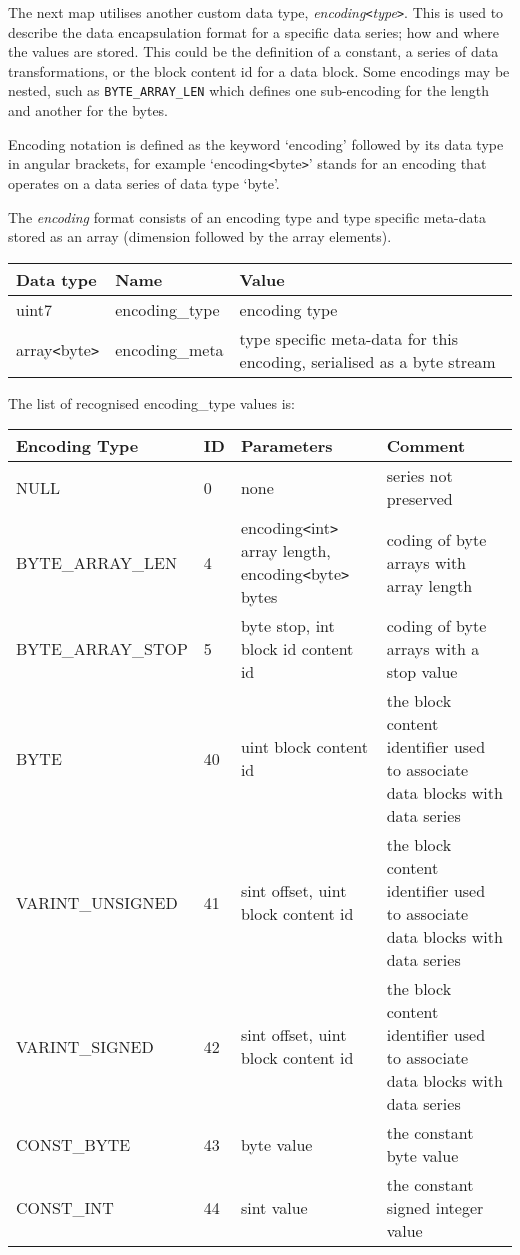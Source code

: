 \documentclass[a4paper]{article}
\begin{document}
The next map utilises another custom data type, \textit{encoding\texttt{<}type\texttt{>}}.
This is used to describe the data encapsulation format for a specific data series; how and where the values are stored.  This could be
the definition of a constant, a series of data transformations, or the
block content id for a data block.  Some encodings may be nested,
such as \texttt{BYTE\_ARRAY\_LEN} which defines one sub-encoding for the
length and another for the bytes.

Encoding notation is defined as the keyword `encoding' followed by its data type 
in angular brackets, for example `encoding\texttt{<}byte\texttt{>}' stands for 
an encoding that operates on a data series of data type `byte'.

The \textit{encoding} format consists of an encoding type and type specific meta-data stored as an array (dimension followed by the array elements).

\begin{tabular}{|l|>{\raggedright}p{120pt}|>{\raggedright}p{260pt}|}
\hline
\textbf{Data type} & \textbf{Name} & \textbf{Value}
\tabularnewline
\hline
uint7 & encoding\_type & encoding type\tabularnewline
\hline
array\texttt{<}byte\texttt{>} & encoding\_meta & type specific meta-data for this encoding, serialised as a byte stream\tabularnewline
\hline
\end{tabular}

The list of recognised encoding\_type values is:

\begin{tabular}{|l|l|>{\raggedright}p{155pt}|>{\raggedright}p{160pt}|}
\hline
\textbf{Encoding Type} & \textbf{ID} & \textbf{Parameters} & \textbf{Comment}\tabularnewline
\hline
NULL & 0 & none & series not preserved\tabularnewline
\hline
BYTE\_ARRAY\_LEN & 4 & encoding\texttt{<}int\texttt{>} array length, encoding\texttt{<}byte\texttt{>} 
bytes & coding of byte arrays with array length\tabularnewline
\hline
BYTE\_ARRAY\_STOP & 5 & byte stop, int block id\linebreak{}
content id & coding of byte arrays with a stop value \tabularnewline
\hline
BYTE & 40 & uint block content id & the block content identifier used to associate 
data blocks with data series\tabularnewline
\hline
VARINT\_UNSIGNED & 41 & sint offset, uint block content id & the block content identifier used to associate data blocks with data series\tabularnewline
\hline
VARINT\_SIGNED & 42 & sint offset, uint block content id & the block content identifier used to associate data blocks with data series\tabularnewline
\hline
CONST\_BYTE & 43 & byte value & the constant byte value\tabularnewline
\hline
CONST\_INT & 44 & sint value & the constant signed integer value\tabularnewline
\hline
\end{tabular}
\end{document}
